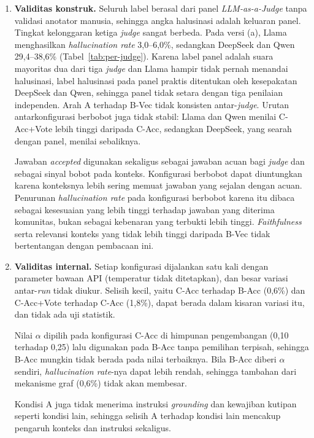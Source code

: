 \begin{enumerate}
    \item \textbf{Validitas konstruk.} Seluruh label berasal dari panel \emph{LLM-as-a-Judge} tanpa validasi anotator manusia, sehingga angka halusinasi adalah keluaran panel. Tingkat kelonggaran ketiga \emph{judge} sangat berbeda. Pada versi (a), Llama menghasilkan \emph{hallucination rate} 3,0--6,0\%, sedangkan DeepSeek dan Qwen 29,4--38,6\% (Tabel~\ref{tab:per-judge}). Karena label panel adalah suara mayoritas dua dari tiga \emph{judge} dan Llama hampir tidak pernah menandai halusinasi, label halusinasi pada panel praktis ditentukan oleh kesepakatan DeepSeek dan Qwen, sehingga panel tidak setara dengan tiga penilaian independen. Arah A terhadap B-Vec tidak konsisten antar-\emph{judge}. Urutan antarkonfigurasi berbobot juga tidak stabil: Llama dan Qwen menilai C-Acc+Vote lebih tinggi daripada C-Acc, sedangkan DeepSeek, yang searah dengan panel, menilai sebaliknya.

    Jawaban \emph{accepted} digunakan sekaligus sebagai jawaban acuan bagi \emph{judge} dan sebagai sinyal bobot pada konteks. Konfigurasi berbobot dapat diuntungkan karena konteksnya lebih sering memuat jawaban yang sejalan dengan acuan. Penurunan \emph{hallucination rate} pada konfigurasi berbobot karena itu dibaca sebagai kesesuaian yang lebih tinggi terhadap jawaban yang diterima komunitas, bukan sebagai kebenaran yang terbukti lebih tinggi. \emph{Faithfulness} serta relevansi konteks yang tidak lebih tinggi daripada B-Vec tidak bertentangan dengan pembacaan ini.

    \item \textbf{Validitas internal.} Setiap konfigurasi dijalankan satu kali dengan parameter bawaan API (temperatur tidak ditetapkan), dan besar variasi antar-\emph{run} tidak diukur. Selisih kecil, yaitu C-Acc terhadap B-Acc (0,6\%) dan C-Acc+Vote terhadap C-Acc (1,8\%), dapat berada dalam kisaran variasi itu, dan tidak ada uji statistik.

    Nilai $\alpha$ dipilih pada konfigurasi C-Acc di himpunan pengembangan (0,10 terhadap 0,25) lalu digunakan pada B-Acc tanpa pemilihan terpisah, sehingga B-Acc mungkin tidak berada pada nilai terbaiknya. Bila B-Acc diberi $\alpha$ sendiri, \emph{hallucination rate}-nya dapat lebih rendah, sehingga tambahan dari mekanisme graf (0,6\%) tidak akan membesar.

    Kondisi A juga tidak menerima instruksi \emph{grounding} dan kewajiban kutipan seperti kondisi lain, sehingga selisih A terhadap kondisi lain mencakup pengaruh konteks dan instruksi sekaligus.


\end{enumerate}
